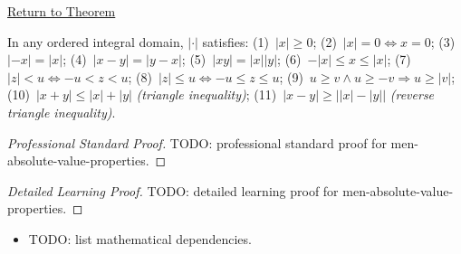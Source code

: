 \newpage
{}
\label{prf:men-absolute-value-properties}

\begin{remark*}[Return]
\hyperref[thm:men-absolute-value-properties]{Return to Theorem}
\end{remark*}

\begin{theorem*}
In any ordered integral domain, $|{\cdot}|$ satisfies:
(1)~$|x|\geq 0$;
(2)~$|x|=0\iff x=0$;
(3)~$|-x|=|x|$;
(4)~$|x-y|=|y-x|$;
(5)~$|xy|=|x||y|$;
(6)~$-|x|\leq x\leq|x|$;
(7)~$|z|<u\iff -u<z<u$;
(8)~$|z|\leq u\iff -u\leq z\leq u$;
(9)~$u\geq v \wedge u\geq -v \Rightarrow u\geq|v|$;
(10)~$|x+y|\leq|x|+|y|$ \textit{(triangle inequality)};
(11)~$|x-y|\geq\bigl||x|-|y|\bigr|$ \textit{(reverse triangle inequality)}.
\end{theorem*}

\begin{proof}[Professional Standard Proof]
\LRAProofBodyStart
TODO: professional standard proof for men-absolute-value-properties.
\end{proof}

\begin{proof}[Detailed Learning Proof]
\LRAProofBodyStart
TODO: detailed learning proof for men-absolute-value-properties.
\end{proof}

\begin{remark*}
\end{remark*}

\begin{dependencies}
\begin{itemize}
  \item TODO: list mathematical dependencies.
\end{itemize}
\end{dependencies}

\clearpage
